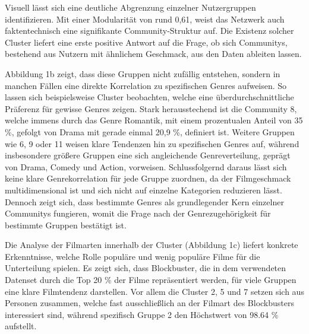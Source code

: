 Visuell lässt sich eine deutliche Abgrenzung einzelner Nutzergruppen identifizieren.
Mit einer Modularität von rund 0,61, weist das Netzwerk auch faktentechnisch eine signifikante Community-Struktur auf.
Die Existenz solcher Cluster liefert eine erste positive Antwort auf die Frage, ob sich Communitys, bestehend aus Nutzern mit ähnlichem Geschmack, aus den Daten ableiten lassen.

Abbildung 1b zeigt, dass diese Gruppen nicht zufällig entstehen, sondern in manchen Fällen eine direkte Korrelation zu spezifischen Genres aufweisen.
So lassen sich beispielsweise Cluster beobachten, welche eine überdurchschnittliche Präferenz für gewisse Genres zeigen.
Stark herausstechend ist die Community 8, welche immens durch das Genre Romantik, mit einem prozentualen Anteil von 35 \%, gefolgt von Drama mit gerade einmal 20,9 \%, definiert ist.
Weitere Gruppen wie 6, 9 oder 11 weisen klare Tendenzen hin zu spezifischen Genres auf, während insbesondere größere Gruppen eine sich angleichende Genreverteilung, geprägt von Drama, Comedy und Action, vorweisen.
Schlussfolgernd daraus lässt sich keine klare Genrekorrelation für jede Gruppe zuordnen, da der Filmgeschmack multidimensional ist und sich nicht auf einzelne Kategorien reduzieren lässt.
Dennoch zeigt sich, dass bestimmte Genres als grundlegender Kern einzelner Communitys fungieren, womit die Frage nach der Genrezugehörigkeit für bestimmte Gruppen bestätigt ist.

Die Analyse der Filmarten innerhalb der Cluster (Abbildung 1c) liefert konkrete Erkenntnisse, welche Rolle populäre und wenig populäre Filme für die Unterteilung spielen.
Es zeigt sich, dass Blockbuster, die in dem verwendeten Datenset durch die Top 20 \% der Filme repräsentiert werden, für viele Gruppen eine klare Filmtendenz darstellen.
Vor allem die Cluster 2, 5 und 7 setzen sich aus Personen zusammen, welche fast ausschließlich an der Filmart des Blockbusters interessiert sind, während spezifisch Gruppe 2 den Höchstwert von 98.64 \% aufstellt.

